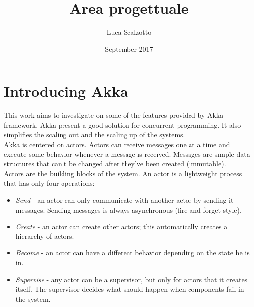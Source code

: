 \documentclass{article}
\title{ Area progettuale }
\author{ Luca Scalzotto }
\date{ September 2017 }
\begin{document}
\maketitle


\section{Introducing Akka}
This work aims to investigate on some of the features provided by Akka framework. Akka present a good solution for concurrent programming. It also simplifies the scaling out and the scaling up of the systems. \\
Akka is centered on actors. Actors can receive messages one at a time and execute some behavior whenever a message is received. Messages are simple data structures that can't be changed after they've been created (immutable). \\
Actors are the building blocks of the system. An actor is a lightweight process that has only four operations:
\begin{itemize}
\item \textit{Send} - an actor can only communicate with another actor by sending it messages. Sending messages is always asynchronous (fire and forget style).
\item \textit{Create} - an actor can create other actors; this automatically creates a hierarchy of actors.
\item \textit{Become} - an actor can have a different behavior depending on the state he is in.
\item \textit{Supervise} - any actor can be a supervisor, but only for actors that it creates itself. The supervisor decides what should happen when components fail in the system.
\end{itemize}
\end{document}

